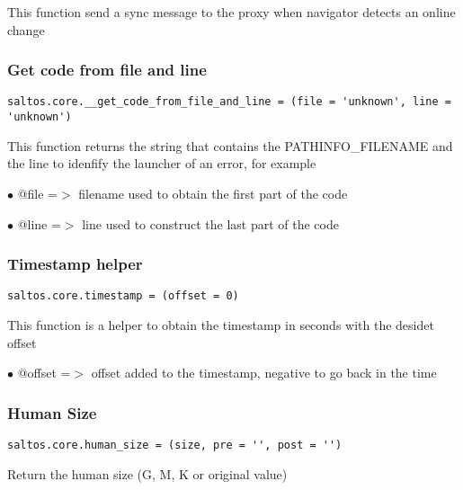 \documentclass[a4paper]{article}
\begin{document}
This function send a sync message to the proxy when navigator detects an online change

\hypertarget{toc718}{}
\subsubsection{Get code from file and line}

\begin{lstlisting}
saltos.core.__get_code_from_file_and_line = (file = 'unknown', line = 'unknown')
\end{lstlisting}

This function returns the string that contains the PATHINFO\_FILENAME and the line to idenfify
the launcher of an error, for example

\begin{compactitem}
\item[\color{myblue}$\bullet$] @file =$>$ filename used to obtain the first part of the code
\item[\color{myblue}$\bullet$] @line =$>$ line used to construct the last part of the code
\end{compactitem}

\hypertarget{toc719}{}
\subsubsection{Timestamp helper}

\begin{lstlisting}
saltos.core.timestamp = (offset = 0)
\end{lstlisting}

This function is a helper to obtain the timestamp in seconds with the desidet offset

\begin{compactitem}
\item[\color{myblue}$\bullet$] @offset =$>$ offset added to the timestamp, negative to go back in the time
\end{compactitem}

\hypertarget{toc720}{}
\subsubsection{Human Size}

\begin{lstlisting}
saltos.core.human_size = (size, pre = '', post = '')
\end{lstlisting}

Return the human size (G, M, K or original value)
\end{document}
